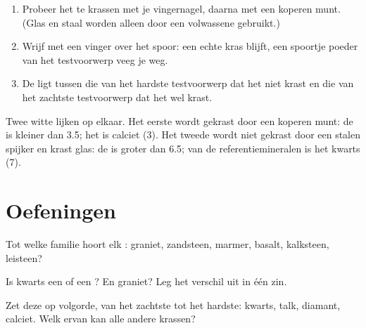 \begin{method}[De krastest]\label{met:g6:rocks-and-minerals:scratch}
\begin{enumerate}
  \item Probeer het  te krassen met je vingernagel, daarna met een
        koperen munt. (Glas en staal worden alleen door een volwassene
        gebruikt.)
  \item Wrijf met een vinger over het spoor: een echte kras blijft, een
        spoortje poeder van het testvoorwerp veeg je weg.
  \item De  ligt tussen die van het hardste testvoorwerp dat het
        niet krast en die van het zachtste testvoorwerp dat het wel krast.
\end{enumerate}
\end{method}

\begin{example}\label{ex:g6:rocks-and-minerals:quartz-calcite}
Twee witte  lijken op elkaar. Het eerste wordt gekrast door een
koperen munt: de  is kleiner dan 3.5; het is calciet (3). Het
tweede wordt niet gekrast door een stalen spijker en krast glas: de
 is groter dan 6.5; van de referentiemineralen is het kwarts (7).
\end{example}

\section{Oefeningen}

\begin{exercise}[$\star$]\label{exo:g6:rocks-and-minerals:1}
Tot welke familie hoort elk : graniet, zandsteen, marmer, basalt,
kalksteen, leisteen?
\end{exercise}

\begin{exercise}[$\star$]\label{exo:g6:rocks-and-minerals:2}
Is kwarts een  of een ? En graniet? Leg het verschil uit
in één zin.
\end{exercise}

\begin{exercise}[$\star$]\label{exo:g6:rocks-and-minerals:3}
Zet deze  op volgorde, van het zachtste tot het hardste: kwarts,
talk, diamant, calciet. Welk ervan kan alle andere krassen?
\end{exercise}

